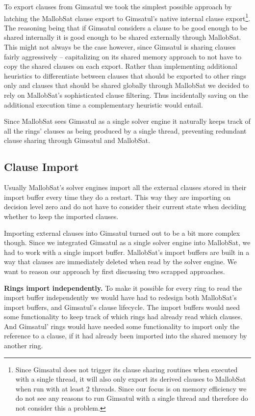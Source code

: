 \documentclass[12pt,a4paper,twoside]{scrartcl}
\numberwithin{equation}{section}
\begin{document}
To export clauses from Gimsatul we took the simplest possible approach by latching the MallobSat clause export to Gimsatul's native internal clause export\footnote{Since Gimsatul does not trigger its clause sharing routines when executed with a single thread, it will also only export its derived clauses to MallobSat when run with at least 2 threads. Since our focus is on memory efficiency we do not see any reasons to run Gimsatul with a single thread and therefore do not consider this a problem.}. The reasoning being that if Gimsatul considers a clause to be good enough to be shared internally it is good enough to be shared externally through MallobSat. This might not always be the case however, since Gimsatul is sharing clauses fairly aggressively -- capitalizing on its shared memory approach to not have to copy the shared clauses on each export. Rather than implementing additional heuristics to differentiate between clauses that should be exported to other rings only and clauses that should be shared globally through MallobSat we decided to rely on MallobSat's sophisticated clause filtering. Thus incidentally saving on the additional execution time a complementary heuristic would entail.

Since MallobSat sees Gimsatul as a single solver engine it naturally keeps track of all the rings' clauses as being produced by a single thread, preventing redundant clause sharing through Gimsatul and MallobSat.

\subsection{Clause Import}

Usually MallobSat's solver engines import all the external clauses stored in their import buffer every time they do a restart. This way they are importing on decision level zero and do not have to consider their current state when deciding whether to keep the imported clauses. 

Importing external clauses into Gimsatul turned out to be a bit more complex though. Since we integrated Gimsatul as a single solver engine into MallobSat, we had to work with a single import buffer. MallobSat's import buffers are built in a way that clauses are immediately deleted when read by the solver engine. We want to reason our approach by first discussing two scrapped approaches.

\textbf{Rings import independently.} To make it possible for every ring to read the import buffer independently we would have had to redesign both MallobSat's import buffers, and Gimsatul's clause lifecycle. The import buffers would need some functionality to keep track of which rings had already read which clauses. And Gimsatul' rings would have needed some functionality to import only the reference to a clause, if it had already been imported into the shared memory by another ring. 
\end{document}
